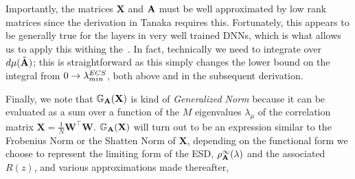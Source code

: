 Importantly, the matrices $\mathbf{X}$  and $\mathbf{\mathbf{A}}$ must be well approximated
by low rank matrices since the derivation in Tanaka requires this.  Fortunately,
this appears to be generally true for the layers in very well trained DNNs,
which is what allows us to apply this withing the~\ECS.
In fact, technically we need to integrate over $d\mu(\tilde{\mathbf{A}})$; this is straightforward
as this simply changes the lower bound on the integral from $0\rightarrow\lambda^{ECS}_{min}$,
both above and in the subsequent derivation.

Finally, we note that $\mathbb{G}_{\mathbf{A}}(\mathbf{X})$ is kind of \emph{Generalized Norm} because 
it can be evaluated as a sum over a function of the $M$ eigenvalues $\lambda_{\mu}$ of the \Teacher
correlation matrix $\mathbf{X}=\frac{1}{N}\mathbf{W}^{\top}\mathbf{W}$.
$\mathbb{G}_{\mathbf{A}}(\mathbf{X})$ will turn out to be an expression similar to the Frobenius Norm or the
Shatten Norm of $\mathbf{X}$, depending on the functional form we choose to represent the
limiting form of the \Student ESD, $\rho_{\mathbf{A}}^{\infty}(\lambda)$ and the associated \RTransform $R(z)$, and various approximations made thereafter,







